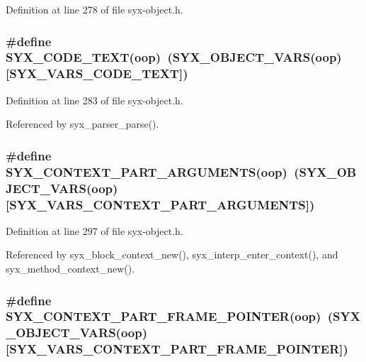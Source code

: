 Definition at line 278 of file syx-object.h.\hypertarget{syx-object_8h_5fc722344cbf193793fcb270dc36607a}{
\subsubsection{\setlength{\rightskip}{0pt plus 5cm}\#define SYX\_\-CODE\_\-TEXT(oop)~(SYX\_\-OBJECT\_\-VARS(oop)\mbox{[}SYX\_\-VARS\_\-CODE\_\-TEXT\mbox{]})}}
\label{syx-object_8h_5fc722344cbf193793fcb270dc36607a}




Definition at line 283 of file syx-object.h.

Referenced by syx\_\-parser\_\-parse().\hypertarget{syx-object_8h_a84583cd063bb91509a65e846f2a0b68}{
\subsubsection{\setlength{\rightskip}{0pt plus 5cm}\#define SYX\_\-CONTEXT\_\-PART\_\-ARGUMENTS(oop)~(SYX\_\-OBJECT\_\-VARS(oop)\mbox{[}SYX\_\-VARS\_\-CONTEXT\_\-PART\_\-ARGUMENTS\mbox{]})}}
\label{syx-object_8h_a84583cd063bb91509a65e846f2a0b68}




Definition at line 297 of file syx-object.h.

Referenced by syx\_\-block\_\-context\_\-new(), syx\_\-interp\_\-enter\_\-context(), and syx\_\-method\_\-context\_\-new().\hypertarget{syx-object_8h_d00ad7dc6539a466500aeeb34524437a}{
\subsubsection{\setlength{\rightskip}{0pt plus 5cm}\#define SYX\_\-CONTEXT\_\-PART\_\-FRAME\_\-POINTER(oop)~(SYX\_\-OBJECT\_\-VARS(oop)\mbox{[}SYX\_\-VARS\_\-CONTEXT\_\-PART\_\-FRAME\_\-POINTER\mbox{]})}}
\label{syx-object_8h_d00ad7dc6539a466500aeeb34524437a}




